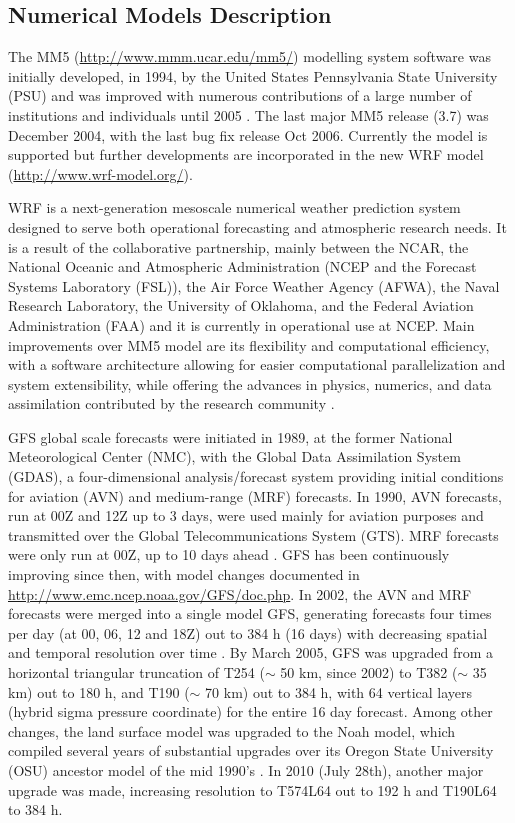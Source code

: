 \subsection{Numerical Models Description} 

The MM5 (\url{http://www.mmm.ucar.edu/mm5/}) modelling system software was initially developed, in 1994, by the United States Pennsylvania State University (PSU) and was improved with numerous contributions of a large number of institutions and individuals until 2005 \citep{Dudhia2005}. The last major MM5 release (3.7) was December 2004, with the last bug fix release Oct 2006. Currently the model is supported but further developments are incorporated in the new WRF model (\url{http://www.wrf-model.org/}). 

WRF is a next-generation mesoscale numerical weather prediction system designed to serve both operational forecasting and atmospheric research needs. It is a result of the collaborative partnership, mainly between the NCAR, the National Oceanic and Atmospheric Administration (NCEP  and the Forecast Systems Laboratory (FSL)), the Air Force Weather Agency (AFWA), the Naval Research Laboratory, the University of Oklahoma, and the Federal Aviation Administration (FAA) and it is currently in operational use at NCEP. Main improvements over MM5 model are its flexibility and computational efficiency, with a software architecture allowing for easier computational parallelization and system extensibility, while offering the advances in physics, numerics, and data assimilation contributed by the research community \citep{WRF2008}.

GFS global scale forecasts were initiated in 1989, at the former National Meteorological Center (NMC), with the Global Data Assimilation System (GDAS), a four-dimensional analysis/forecast system providing initial conditions for aviation (AVN) and medium-range (MRF) forecasts. In 1990, AVN forecasts, run at 00Z and 12Z up to 3 days, were used mainly for aviation purposes and transmitted over the Global Telecommunications System (GTS). MRF forecasts were only run at 00Z, up to 10 days ahead \citep{Kalnay1990}.  GFS has been continuously improving since then, with model changes documented in \url{http://www.emc.ncep.noaa.gov/GFS/doc.php}. In 2002, the AVN and MRF forecasts were merged into a single model GFS, generating forecasts four times per day (at 00, 06, 12 and 18Z) out to 384 h (16 days) with decreasing spatial and temporal resolution over time \citep{EMC2003}. By March 2005, GFS was upgraded from a horizontal triangular truncation of T254 ($\sim$ 50 km, since 2002) to T382 ($\sim$ 35 km) out to 180 h, and T190 ($\sim$ 70 km) out to 384 h, with 64 vertical layers (hybrid sigma pressure coordinate) for the entire 16 day forecast. Among other changes, the land surface model was upgraded to the Noah model, which compiled several years of substantial upgrades over its Oregon State University (OSU) ancestor model of the mid 1990's \citep{CampanaCaplan2005}. In 2010 (July 28th), another major upgrade was made, increasing resolution to T574L64 out to 192 h and T190L64 to 384 h.

